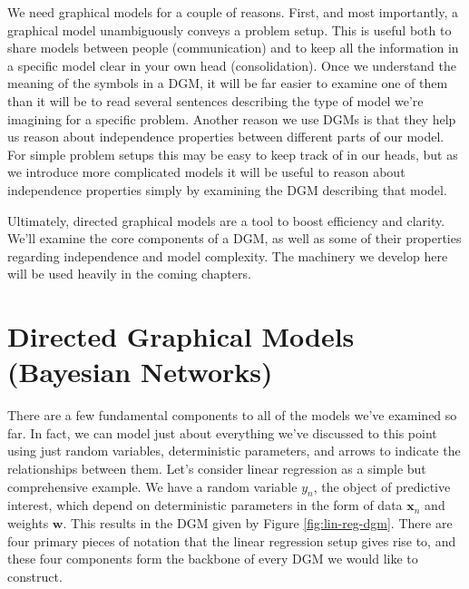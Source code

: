 We need graphical models for a couple of reasons. First, and most importantly, a graphical model unambiguously conveys a problem setup. This is useful both to share models between people (communication) and to keep all the information in a specific model clear in your own head (consolidation). Once we understand the meaning of the symbols in a DGM, it will be far easier to examine one of them than it will be to read several sentences describing the type of model we're imagining for a specific problem. Another reason we use DGMs is that they help us reason about independence properties between different parts of our model. For simple problem setups this may be easy to keep track of in our heads, but as we introduce more complicated models it will be useful to reason about independence properties simply by examining the DGM describing that model.

Ultimately, directed graphical models are a tool to boost efficiency and clarity. We'll examine the core components of a DGM, as well as some of their properties regarding independence and model complexity. The machinery we develop here will be used heavily in the coming chapters.

\section{Directed Graphical Models (Bayesian Networks)}
There are a few fundamental components to all of the models we've examined so far. In fact, we can model just about everything we've discussed to this point using just random variables, deterministic parameters, and arrows to indicate the relationships between them. Let's consider linear regression as a simple but comprehensive example. We have a random variable $y_n$, the object of predictive interest, which depend on deterministic parameters in the form of data $\textbf{x}_n$ and weights $\textbf{w}$. This results in the DGM given by Figure \ref{fig:lin-reg-dgm}. There are four primary pieces of notation that the linear regression setup gives rise to, and these four components form the backbone of every DGM we would like to construct.

